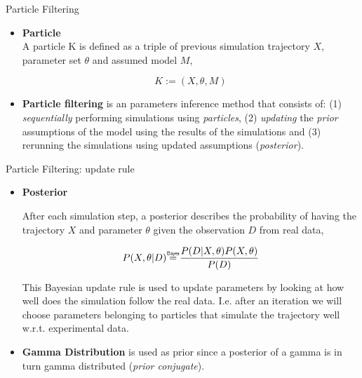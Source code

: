\documentclass[pdf]
{beamer}
\newcommand\bayeseq{\mathrel{\overset{\makebox[0pt]{\mbox{\normalfont\tiny\sffamily Bayes}}}{=}}}
\begin{document}
\begin{frame}{Particle Filtering}

	\begin{itemize}

	\item \textbf{Particle}\\
	A particle K is defined as a triple of previous simulation trajectory $X$, parameter set $\theta$ and
assumed model $M$,

		\begin{equation}
		K := (X, \theta, M)
		\end{equation}
		
	\item \textbf{Particle filtering} is an parameters inference method that consists of: (1) \textit{sequentially} performing simulations using \textit{particles}, (2) \textit{updating} the \textit{prior} assumptions of the model using the results of the simulations and (3) rerunning the simulations using updated assumptions (\textit{posterior}).
	
	\end{itemize}

\end{frame}

\begin{frame}{Particle Filtering: update rule}

	\begin{itemize}
	\item \textbf{Posterior}
	
	After each simulation step, a posterior describes the probability of having the trajectory $X$ and
parameter $\theta$ given the observation $D$ from real data,

	\begin{equation}
	P (X, \theta |D) \bayeseq \frac{P(D|X, \theta) P(X, \theta)}{P(D)}
	\end{equation}
	
	This Bayesian update rule is used to update parameters by looking at how well does the simulation follow the real data. I.e. after an iteration we will choose parameters belonging to particles that simulate the trajectory well w.r.t. experimental data.
	
	\item \textbf{Gamma Distribution} is used as prior since a posterior of a gamma is in turn gamma distributed (\textit{prior conjugate}).
	\end{itemize}
	
\end{frame}
\end{document}
